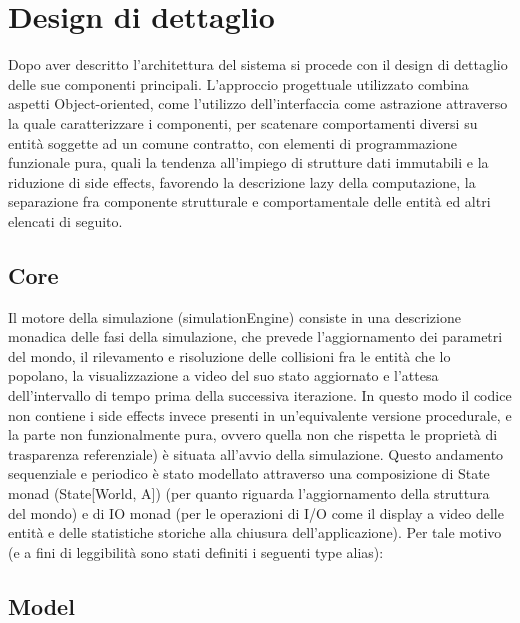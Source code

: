 \section{Design di dettaglio}

Dopo aver descritto l’architettura del sistema si procede con il design di dettaglio delle sue componenti principali. 
L’approccio progettuale utilizzato combina aspetti Object-oriented, come l’utilizzo dell’interfaccia come astrazione attraverso la quale caratterizzare i componenti, per scatenare comportamenti diversi su entità soggette ad un comune contratto, con elementi di programmazione funzionale pura, quali la tendenza all’impiego di strutture dati immutabili e la riduzione di side effects, favorendo la descrizione lazy della computazione, la separazione fra componente strutturale e comportamentale delle entità ed altri elencati di seguito.


\subsection{Core}
Il motore della simulazione (simulationEngine) consiste in una descrizione monadica delle fasi della simulazione, che prevede l’aggiornamento dei parametri del mondo, il rilevamento e risoluzione delle collisioni fra le entità che lo popolano, la visualizzazione a video del suo stato aggiornato e l’attesa dell’intervallo di tempo prima della successiva iterazione. In questo modo il codice non contiene i side effects invece presenti in un’equivalente versione procedurale, e la parte non funzionalmente pura, ovvero quella non che rispetta le proprietà di trasparenza referenziale) è situata all’avvio della simulazione. 
Questo andamento sequenziale e periodico è stato modellato attraverso una composizione di State monad  (State[World, A]) (per quanto riguarda l’aggiornamento della struttura del mondo) e di IO monad (per le operazioni di I/O come il display a video delle entità e delle statistiche storiche alla chiusura dell’applicazione). Per tale motivo (e a fini di leggibilità sono stati definiti i seguenti type alias):


\subsection{Model}


